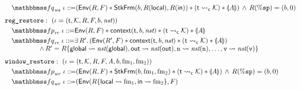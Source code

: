 \begin{figure}[!thp]
\[\begin{array}{l}
            \\[-9pt]
            \quad
            \relspecpost_{\textit{ws}} \ \lgvl \define 
            (\Env{\RFile, \Wstack} \sepstar 
            \RelStkFm{\block}{\RFile(\localRN)}{\RFile(\inRN)}
            \sepstar (\astCurCont{\thrdid}{\hthrdlocalst}) \sepstar 
            \safePrimAst{\primcom}) \, \land \, \RFile(\spreg) = (\block, 0) \\
            \\[-5pt]
            \texttt{reg\_restore}: \ (\lgvl = (\thrdid, \hthrdlocalst, \RFile, \Wstack, 
                \block, \nst)) \\
            \\[-9pt]
            \quad
            \relspecpre_{\textit{rr}} \ \lgvl \define \Env{\RFile, \Wstack} \sepstar 
            \relcontext{\thrdid}{\block}{\nst} \sepstar 
            (\astCurCont{\thrdid}{\hthrdlocalst}) \sepstar \safePrimAst{\primcom} \\
            \\[-9pt]
            \quad
            \relspecpost_{\textit{rr}} \ \lgvl \define \exists \, \RFile'. \,  (\Env{\RFile', \Wstack}
            \sepstar \relcontext{\thrdid}{\block}{\nst} \sepstar 
            (\astCurCont{\thrdid}{\hthrdlocalst}) \sepstar \safePrimAst{\primcom}
            )  \\
            \hspace*{5em}
            \, \land \, 
            \RFile' = \RFile\{ \globalRN \rightsquigarrow \nst(\globalRN), 
                \outRN \rightsquigarrow \nst(\outRN), \regn \rightsquigarrow \nst(\regn), 
                \dots, \regv \rightsquigarrow \nst(\regv) \} \\
            \\[-5pt]
            \texttt{window\_restore}: \ (\lgvl = (\thrdid, \hthrdlocalst, \RFile, \Wstack, 
            \primcom, \block, \fm_1, \fm_2)) \\
            \\[-9pt]
            \quad
            \relspecpre_{\textit{wr}} \ \lgvl \define 
            (\Env{\RFile, \Wstack} \sepstar \RelStkFm{\block}{\fm_1}{\fm_2} 
            \sepstar (\astCurCont{\thrdid}{\hthrdlocalst}) \sepstar 
            \safePrimAst{\primcom}) \, \land \, \RFile(\spreg) = (\block, 0) \\
            \\[-9pt]
            \quad
            \relspecpost_{\textit{wr}} \ \lgvl \define 
            (\Env{\RFile\{ \localRN \rightsquigarrow \fm_1, \inRN \rightsquigarrow \fm_2 \}, \Wstack} \

\end{array}\]
\end{figure}
